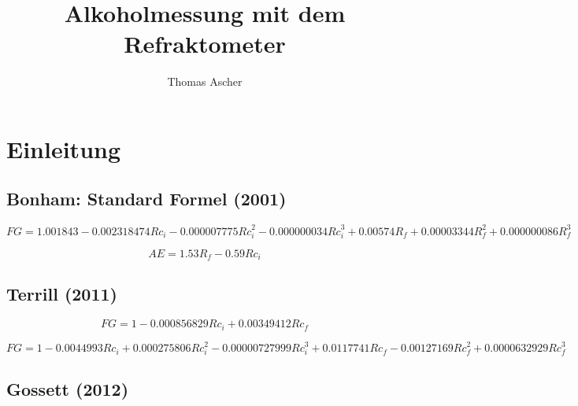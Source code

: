\documentclass[a4paper,parskip=half]{scrartcl}
\title{Alkoholmessung mit dem Refraktometer}
\author{Thomas Ascher}
\begin{document}
\maketitle

\section*{Einleitung}

\autocite{Terrill2013}
\autocite{Novotny2017}
\autocite{Novotny2017a}
\autocite{Bonham2001}
\autocite{Gossett2012}
\autocite{Gossett2012a}
\autocite{Gossett2012b}
\autocite{Gossett2012c}
\autocite{Troester2012}
\autocite{Terrill2010}
\autocite{Terrill2010a}
\autocite{Terrill2011}
\autocite{Siebel1938}
\autocite{Weiss2016}

\newcommand{\rii}{\mathit{R}_i}
\newcommand{\riic}{\mathit{Rc}_i}
\newcommand{\rif}{\mathit{R}_f}
\newcommand{\rifc}{\mathit{Rc}_f}

\subsection*{Bonham: Standard Formel (2001)}

\begin{equation}
\mathit{FG}=1.001843 - 0.002318474 \riic - 0.000007775 \riic^2 -
0.000000034 \riic^3 + 0.00574 \rif +
0.00003344 \rif^2 + 0.000000086 \rif^3
\label{eq:bonham} 
\end{equation}

\begin{equation}
\mathit{AE}=1.53 \rif - 0.59 \riic
\label{eq:gardner} 
\end{equation}

\subsection*{Terrill (2011)}

\begin{equation}
\mathit{FG}=1 - 0.000856829 \riic + 0.00349412 \rifc
\label{eq:terrilllinear} 
\end{equation}

\begin{equation}
\mathit{FG}=1 - 0.0044993 \riic + 0.000275806 \riic^2 -
0.00000727999 \riic^3 + 0.0117741 \rifc -
0.00127169 \rifc^2 + 0.0000632929 \rifc^3
\label{eq:terrillcubic} 
\end{equation}

\subsection*{Gossett (2012)}
\end{document}
